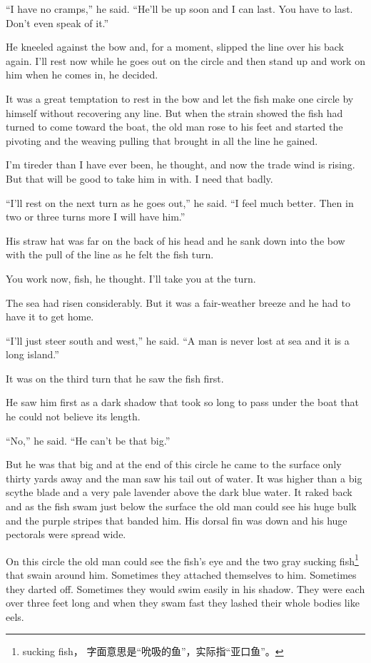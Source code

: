 \documentclass[fontset=ubuntu]{ctexrep}
\begin{document}
``I have no cramps,'' he said. ``He'll be up soon and I can last. You have
to last. Don't even speak of it.''

He kneeled against the bow and, for a moment, slipped the line over his back
again. I'll rest now while he goes out on the circle and then stand up and
work on him when he comes in, he decided.

It was a great \gls{temptation} to rest in the bow and let the fish make one
circle by himself without recovering any line. But when the strain showed
the fish had turned to come toward the boat, the old man rose to his feet
and started the pivoting and the \gls{weaving} pulling that brought in all the
line he gained.

I'm tireder than I have ever been, he thought, and now the trade wind is
rising. But that will be good to take him in with. I need that badly.

``I'll rest on the next turn as he goes out,'' he said. ``I feel much
better. Then in two or three turns more I will have him.''

His straw hat was far on the back of his head and he sank down into the bow
with the pull of the line as he felt the fish turn.

You work now, fish, he thought. I'll take you at the turn.

The sea had risen \gls{considerably}. But it was a \gls{fair-weather} breeze and
he had to have it to get home.

``I'll just \gls{steer} south and west,'' he said. ``A man is never lost at sea
and it is a long island.''

It was on the third turn that he saw the fish first.

He saw him first as a dark shadow that took so long to pass under the boat
that he could not believe its length.

``No,'' he said. ``He can't be that big.''

But he was that big and at the end of this circle he came to the surface
only thirty yards away and the man saw his tail out of water. It was higher
than a big scythe blade and a very \gls{pale} lavender above the dark blue
water. It \gls{raked} back and as the fish swam just below the surface the
old man could see his huge \gls{bulk} and the purple stripes that
\gls{banded} him. His \gls{dorsal} fin was down and his huge \gls{pectorals}
were spread wide.

On this circle the old man could see the fish's eye and the two gray sucking
fish\footnote{sucking fish， 字面意思是“吮吸的鱼”，实际指“亚口鱼”。}
that swain around him. Sometimes they \gls{attached} themselves to him.
Sometimes they \gls{darted} off. Sometimes they would swim easily in his
shadow. They were each over three feet long and when they swam fast they
\gls{lashed} their whole bodies like \glspl{eel}.
\end{document}
